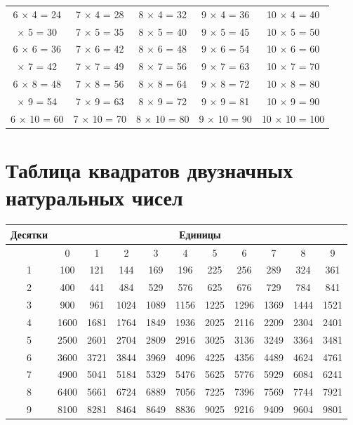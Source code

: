 \documentclass[a5paper, 8pt]{extarticle}
\begin{document}
{\begin{center}
{\begin{tabular}{|c|c|c|c|c|}
\hline 
6 $\times$ 4 = 24 & 7 $\times$ 4 = 28 &8 $\times$ 4 = 32 &9 $\times$ 4 = 36 &10 $\times$ 4 = 40\\ 
\rowcolor{Gray}
\hline 
6 $\times$ 5 = 30 & 7 $\times$ 5 = 35 & 8 $\times$ 5 = 40 &9 $\times$ 5 = 45 &10 $\times$ 5 = 50\\
\hline 
6 $\times$ 6 = 36 & 7 $\times$ 6 = 42 &8 $\times$ 6 = 48 &9 $\times$ 6 = 54 &10 $\times$ 6 = 60\\ 
\rowcolor{Gray}
\hline 
6 $\times$ 7 = 42 & 7 $\times$ 7 = 49 &8 $\times$ 7 = 56 &9 $\times$ 7 = 63 &10 $\times$ 7 = 70\\
\hline 
6 $\times$ 8 = 48 & 7 $\times$ 8 = 56 &8 $\times$ 8 = 64 &9 $\times$ 8 = 72 &10 $\times$ 8 = 80\\ 
\rowcolor{Gray}
\hline 
6 $\times$ 9 = 54 &7 $\times$ 9 = 63 &8 $\times$ 9 = 72 &9 $\times$ 9 = 81 &10 $\times$ 9 = 90\\
\hline 
6 $\times$ 10 = 60 &7 $\times$ 10 = 70 &8 $\times$ 10 = 80 &9 $\times$ 10 = 90 &10 $\times$ 10 = 100\\ 
\hline 
\end{tabular} 
}
\end{center}
}



\section{Таблица квадратов двузначных натуральных чисел}

\begin{center}
{\setlength{\extrarowheight}{3pt}
\begin{tabular}{|c|c|c|c|c|c|c|c|c|c|c|}
\hline 
\rowcolor{Gray}
Десятки & \multicolumn{10}{c|}{Единицы} \\ 
\hline 
& 0 & 1 & 2 & 3 & 4 & 5 & 6 & 7 & 8 & 9 \\ 
\hline 
\rowcolor{Gray}
1 & 100 & 121 & 144 & 169 & 196 & 225 & 256 & 289 & 324 & 361 \\ 
\hline 
2 & 400 & 441 & 484 & 529 & 576 & 625 & 676 & 729 & 784 & 841 \\ 
\hline 
\rowcolor{Gray}
3 & 900 & 961 & 1024 & 1089 & 1156 & 1225 & 1296 & 1369 & 1444 & 1521 \\ 
\hline 
4 & 1600 & 1681 & 1764 & 1849 & 1936 & 2025 & 2116 & 2209 & 2304 & 2401 \\ 
\hline 
\rowcolor{Gray}
5 & 2500 & 2601 & 2704 & 2809 & 2916 & 3025 & 3136 & 3249 & 3364 & 3481 \\ 
\hline 
6 & 3600 & 3721 & 3844 & 3969 & 4096 & 4225 & 4356 & 4489 & 4624 & 4761 \\ 
\hline 
\rowcolor{Gray}
7 & 4900 & 5041 & 5184 & 5329 & 5476 & 5625 & 5776 & 5929 & 6084 & 6241 \\ 
\hline 
8 & 6400 & 5661 & 6724 & 6889 & 7056 & 7225 & 7396 & 7569 & 7744 & 7921 \\ 
\hline 
\rowcolor{Gray}
9 & 8100 & 8281 & 8464 & 8649 & 8836 & 9025 & 9216 & 9409 & 9604 & 9801 \\ 
\hline 
\end{tabular} 
}
\end{center}
\end{document}
